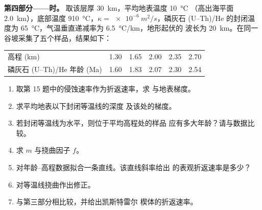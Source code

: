 \begin{problem}
\medskip\noindent\textbf{第四部分——时。}
取该层厚 \qty{30}{km}，平均地表温度 \qty{10}{\celsius}
（高出海平面 \qty{2.0}{km}），底部温度 \qty{910}{\celsius}，$\kappa
= \qty{e-6}{m^2/s}$，磷灰石
(U--Th)/He 的封闭温度为 \qty{65}{\celsius}，气温垂直递减率为 \qty{6.5}{\celsius/km}，地形起伏的
波长为 \qty{20}{km}。在同一谷坡采集了五个样品，结果如下：
\begin{center}
\small
\begin{tabular}{lccccc}
\hline
高程 (\unit{km}) & 1.30 & 1.65 & 2.00 & 2.35 & 2.70 \\
磷灰石 (U--Th)/He 年龄 (\unit{Ma}) & 1.60 & 1.83 & 2.07 & 2.30 & 2.54 \\
\hline
\end{tabular}
\end{center}
\begin{enumerate}[resume]
  \item 取第 15 题中的侵蚀速率作为折返速率，求
        与地表梯度。
  \item 求平均地表以下封闭等温线的深度
        及该处的梯度。
  \item 若封闭等温线为水平，则位于平均高程处的样品
        应有多大年龄？请与数据比较。
  \item 求 $m$ 与挠曲因子 $f$。
  \item 对年龄–高程数据拟合一条直线。该直线斜率给出
        的表观折返速率是多少？
  \item 对等温线挠曲作出修正。
  \item 与第三部分相比较，并给出凯斯特雷尔
        楔体的折返速率。
\end{enumerate}
\end{problem}
